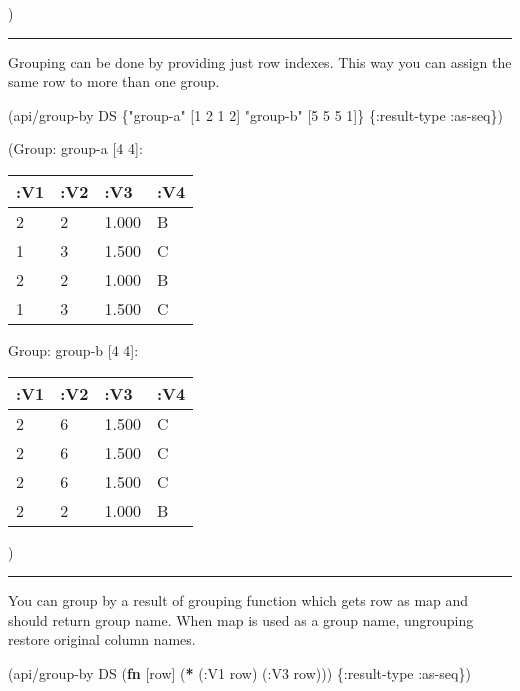 \documentclass[]{article}
\newenvironment{Shaded}{\begin{snugshade}}{\end{snugshade}}
\newcommand{\KeywordTok}[1]{\textcolor[rgb]{0.13,0.29,0.53}{\textbf{#1}}}
\newcommand{\DecValTok}[1]{\textcolor[rgb]{0.00,0.00,0.81}{#1}}
\newcommand{\StringTok}[1]{\textcolor[rgb]{0.31,0.60,0.02}{#1}}
\newcommand{\AttributeTok}[1]{\textcolor[rgb]{0.77,0.63,0.00}{#1}}
\newcommand{\NormalTok}[1]{#1}
\begin{document}
)

\begin{center}\rule{0.5\linewidth}{0.5pt}\end{center}

Grouping can be done by providing just row indexes. This way you can
assign the same row to more than one group.

\begin{Shaded}
\begin{Highlighting}[]
\NormalTok{(api/group-by DS \{}\StringTok{"group-a"}\NormalTok{ [}\DecValTok{1} \DecValTok{2} \DecValTok{1} \DecValTok{2}\NormalTok{]}
                  \StringTok{"group-b"}\NormalTok{ [}\DecValTok{5} \DecValTok{5} \DecValTok{5} \DecValTok{1}\NormalTok{]\} \{}\AttributeTok{:result-type} \AttributeTok{:as-seq}\NormalTok{\})}
\end{Highlighting}
\end{Shaded}

(Group: group-a {[}4 4{]}:

\begin{longtable}[]{@{}llll@{}}
\toprule
:V1 & :V2 & :V3 & :V4\tabularnewline
\midrule
\endhead
2 & 2 & 1.000 & B\tabularnewline
1 & 3 & 1.500 & C\tabularnewline
2 & 2 & 1.000 & B\tabularnewline
1 & 3 & 1.500 & C\tabularnewline
\bottomrule
\end{longtable}

Group: group-b {[}4 4{]}:

\begin{longtable}[]{@{}llll@{}}
\toprule
:V1 & :V2 & :V3 & :V4\tabularnewline
\midrule
\endhead
2 & 6 & 1.500 & C\tabularnewline
2 & 6 & 1.500 & C\tabularnewline
2 & 6 & 1.500 & C\tabularnewline
2 & 2 & 1.000 & B\tabularnewline
\bottomrule
\end{longtable}

)

\begin{center}\rule{0.5\linewidth}{0.5pt}\end{center}

You can group by a result of grouping function which gets row as map and
should return group name. When map is used as a group name, ungrouping
restore original column names.

\begin{Shaded}
\begin{Highlighting}[]
\NormalTok{(api/group-by DS (}\KeywordTok{fn}\NormalTok{ [row] (}\KeywordTok{*}\NormalTok{ (}\AttributeTok{:V1}\NormalTok{ row)}
\NormalTok{                             (}\AttributeTok{:V3}\NormalTok{ row))) \{}\AttributeTok{:result-type} \AttributeTok{:as-seq}\NormalTok{\})}
\end{Highlighting}
\end{Shaded}
\end{document}
